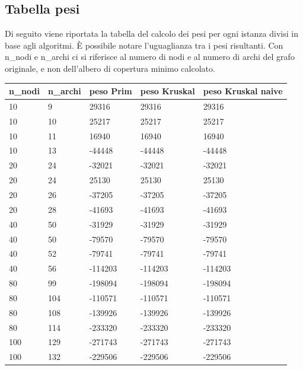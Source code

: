 \newpage

\subsection{Tabella pesi}
\label{tabella\_pesi}

Di seguito viene riportata la tabella del calcolo dei pesi per ogni istanza divisi in base agli algoritmi. È possibile notare l'uguaglianza tra i pesi risultanti.
Con n\_nodi e n\_archi ci si riferisce al numero di nodi e al numero di archi del grafo originale, e non dell'albero di copertura minimo calcolato. 

\renewcommand{\arraystretch}{2}
\begin{longtable}[H]{|p{1.5cm}|p{1.5cm}|p{2cm}|p{3cm}|p{4cm}|} \hline
    \rowcolor{lightgray}
    \textbf{n\_nodi} & \textbf{n\_archi} & \textbf{peso Prim} & \textbf{peso Kruskal} & \textbf{peso Kruskal naive} \\ \hline\hline
    \endhead
    10 & 9 & 29316 & 29316 & 29316 \\ \hline
    10 & 10 & 25217 & 25217 & 25217 \\ \hline
    10 & 11 & 16940 & 16940 & 16940 \\ \hline
    10 & 13 & -44448 & -44448 & -44448 \\ \hline
    20 & 24 & -32021 & -32021 & -32021 \\ \hline 
    20 & 24 & 25130 & 25130 & 25130 \\ \hline
    20 & 26 & -37205 & -37205 & -37205 \\ \hline
    20 & 28 & -41693 & -41693 & -41693 \\ \hline
    40 & 50 & -31929 & -31929 & -31929 \\ \hline
    40 & 50 & -79570 & -79570 & -79570 \\ \hline
    40 & 52 & -79741 & -79741 & -79741 \\ \hline
    40 & 56 & -114203 & -114203 & -114203 \\ \hline
    80 & 99 & -198094 & -198094 & -198094 \\ \hline
    80 & 104 & -110571 & -110571 & -110571 \\ \hline
    80 & 108 & -139926 & -139926 & -139926 \\ \hline
    80 & 114 & -233320 & -233320 & -233320 \\ \hline
    100 & 129 & -271743 & -271743 & -271743 \\ \hline
    100 & 132 & -229506 & -229506 & -229506 \\ \hline

\end{longtable}
